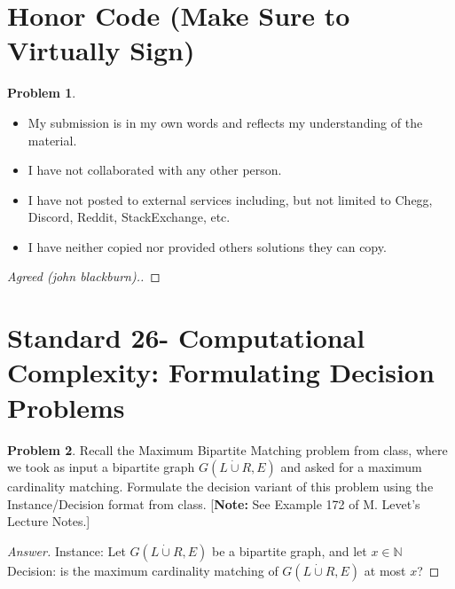 \documentclass[11pt]{article}
\theoremstyle{definition}
\theoremstyle{definition}
\newtheorem{required}{Problem}
\theoremstyle{definition}
\begin{document}
\section{Honor Code (Make Sure to Virtually Sign)} \label{HonorCode}

\begin{required}
\noindent 
\begin{itemize}
\item My submission is in my own words and reflects my understanding of the material.
\item I have not collaborated with any other person.
\item I have not posted to external services including, but not limited to Chegg, Discord, Reddit, StackExchange, etc.
\item I have neither copied nor provided others solutions they can copy.
\end{itemize}

\end{required}

\begin{proof}[Agreed (john blackburn).]
\end{proof}


\newpage
\section{Standard 26- Computational Complexity: Formulating Decision Problems}

\begin{required}
Recall the \textsf{Maximum Bipartite Matching} problem from class, where we took as input a bipartite graph $G(L \dot \cup R, E)$ and asked for a maximum cardinality matching. Formulate the decision variant of this problem using the \textsf{Instance}/\textsf{Decision} format from class. [\textbf{Note:} See Example 172 of M. Levet's Lecture Notes.]
\end{required}

\begin{proof}[Answer]


Instance: Let $G(L \dot \cup R, E)$ be a bipartite graph, and let $x \in \mathbb{N}$\newline
Decision: is the maximum cardinality matching of $G(L \dot \cup R, E)$ at most $x$?



\end{proof}
\end{document}

